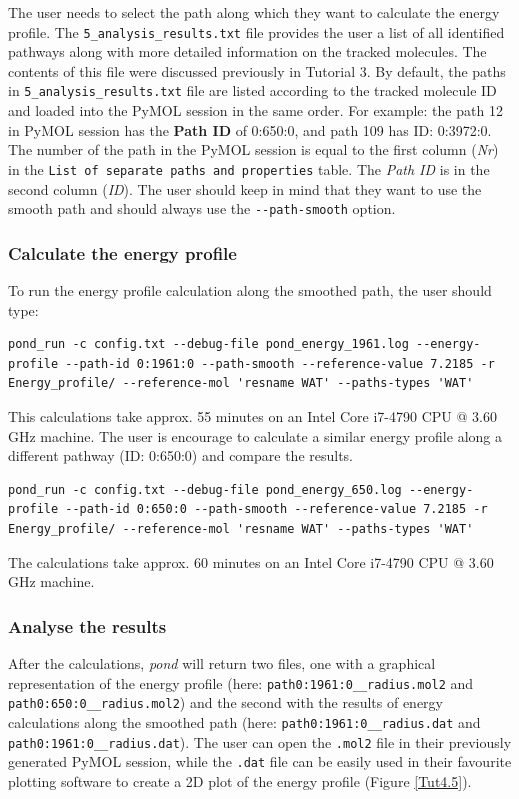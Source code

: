 \documentclass[9pt,tutorial]{livecoms}
\begin{document}
The user needs to select the path along which they want to calculate the energy profile. The \texttt{5\_analysis\_results.txt} file provides the user a list of all identified pathways along with more detailed information on the tracked molecules. The contents of this file were discussed previously in Tutorial 3. By default, the paths in \texttt{5\_analysis\_results.txt} file are listed according to the tracked molecule ID and loaded into the PyMOL session in the same order. For example: the path 12 in PyMOL session has the \textbf{Path ID} of 0:650:0, and path 109 has ID: 0:3972:0. The number of the path in the PyMOL session is equal to the first column (\emph{Nr}) in the \texttt{List of separate paths and properties} table. The \textit{Path ID} is in the second column (\emph{ID}). The user should keep in mind that they want to use the smooth path and should always use the \texttt{-{}-path-smooth} option.

\subsubsection{Calculate the energy profile}
To run the energy profile calculation along the smoothed path, the user should type:
\begin{lstlisting}
pond_run -c config.txt --debug-file pond_energy_1961.log --energy-profile --path-id 0:1961:0 --path-smooth --reference-value 7.2185 -r Energy_profile/ --reference-mol 'resname WAT' --paths-types 'WAT'
\end{lstlisting}
This calculations take approx. 55 minutes on an Intel Core i7-4790 CPU @ 3.60 GHz machine.
The user is encourage to calculate a similar energy profile along a different pathway (ID: 0:650:0) and compare the results.
\begin{lstlisting}
pond_run -c config.txt --debug-file pond_energy_650.log --energy-profile --path-id 0:650:0 --path-smooth --reference-value 7.2185 -r Energy_profile/ --reference-mol 'resname WAT' --paths-types 'WAT'
\end{lstlisting}
The calculations take approx. 60 minutes on an Intel Core i7-4790 CPU @ 3.60 GHz machine.

\subsubsection{Analyse the results}
After the calculations, \emph{pond} will return two files, one with a graphical representation of the energy profile (here: \texttt{path0:1961:0\_\_radius.mol2} and \texttt{path0:650:0\_\_radius.mol2}) and the second with the results of energy calculations along the smoothed path (here: \texttt{path0:1961:0\_\_radius.dat} and \texttt{path0:1961:0\_\_radius.dat}). The user can open the \texttt{.mol2} file in their previously generated PyMOL session, while the \texttt{.dat} file can be easily used in their favourite plotting software to create a 2D plot of the energy profile (Figure \ref{Tut4.5}).
\end{document}
